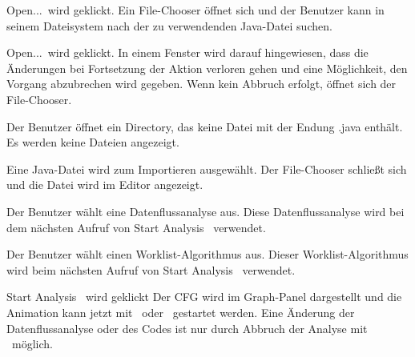 

{\glqq Open...\grqq\ wird geklickt.}
{Ein File-Chooser öffnet sich und der Benutzer kann in seinem Dateisystem nach der zu verwendenden Java-Datei suchen.}

{\glqq Open...\grqq\ wird geklickt.}
{In einem Fenster wird darauf hingewiesen, dass die Änderungen bei Fortsetzung der Aktion verloren gehen und eine Möglichkeit, den Vorgang abzubrechen wird gegeben. Wenn kein Abbruch erfolgt, öffnet sich der File-Chooser.}

{Der Benutzer öffnet ein Directory, das keine Datei mit der Endung .java enthält.}
{Es werden keine Dateien angezeigt.}

{Eine Java-Datei wird zum Importieren ausgewählt.}
{Der File-Chooser schließt sich und die Datei wird im Editor angezeigt.}



{Der Benutzer wählt eine Datenflussanalyse aus.}
{Diese Datenflussanalyse wird bei dem nächsten Aufruf von \glqq Start Analysis \grqq\ verwendet.}

{Der Benutzer wählt einen Worklist-Algorithmus aus.}
{Dieser Worklist-Algorithmus wird beim nächsten Aufruf von \glqq Start Analysis \grqq\ verwendet.}

\newpage


{\glqq Start Analysis \grqq\ wird geklickt}
{Der CFG wird im Graph-Panel dargestellt und die Animation kann jetzt mit \faStepForward\ oder \faPlay\ gestartet werden. Eine Änderung der Datenflussanalyse oder des Codes ist nur durch Abbruch der Analyse mit \faStop\  möglich.}

